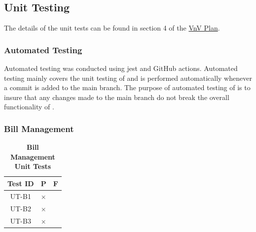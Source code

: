 \documentclass[12pt, titlepage]{article}
\begin{document}
					
					






					
					




\subsection{Unit Testing}

The details of the unit tests can be found in section 4 of the \href{https://github.com/DangJustin/CapstoneProject/blob/main/docs/VnVPlan/VnVPlan.pdf}{VnV Plan}.

\subsubsection{Automated Testing}

Automated testing was conducted using jest and GitHub actions. Automated testing mainly covers the unit testing of \progname{} and is performed automatically whenever a commit is added to the main branch. The purpose of automated testing of \progname{} is to insure that any changes made to the main branch do not break the overall functionality of \progname{}.

\subsubsection{Bill Management}

\begin{table}[H]
\centering
\begin{tabular}{|c|c|c|}
\hline
Test ID & P & F\\
\hline 
UT-B1 & $\times$ & \\
UT-B2 & $\times$ & \\
UT-B3 & $\times$ & \\
\hline
\end{tabular}
\caption{\bf Bill Management Unit Tests}
\end{table}
\end{document}
